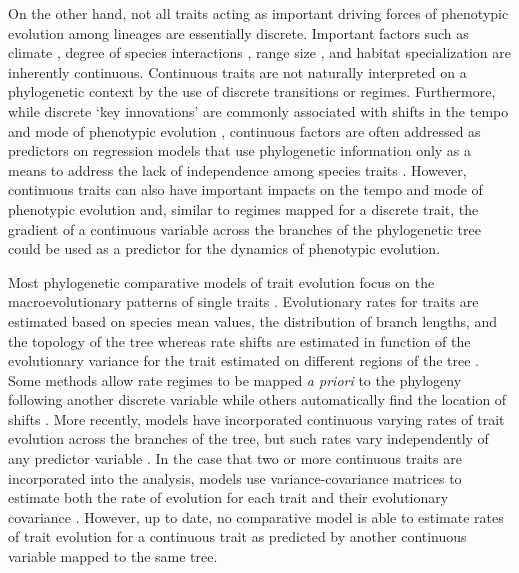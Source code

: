 On the other hand, not all traits acting as important driving forces of phenotypic evolution among lineages are essentially discrete. Important factors such as climate \citep{hunt_simple_2015, clavel_accelerated_2017}, degree of species interactions \citep{galetti_functional_2013, thompson_diversification_2013}, range size \citep{Diniz_range_1998, pigot_speciation_2012}, and habitat specialization \citep{bonetti_evolution_2014, hardy_specialization_2014} are inherently continuous. Continuous traits are not naturally interpreted on a phylogenetic context by the use of discrete transitions or regimes. Furthermore, while discrete `key innovations' are commonly associated with shifts in the tempo and mode of phenotypic evolution \citep[e.g.,][]{revell_phylogenetic_2009, claverie_modularity_2011, benson_rates_2013, dececchi_body_2013, maddison_unsolved_2015}, continuous factors are often addressed as predictors on regression models that use phylogenetic information only as a means to address the lack of independence among species traits \citep{felsenstein_1985, grafen_phylogenetic_1989, blomberg_independent_2012}. However, continuous traits can also have important impacts on the tempo and mode of phenotypic evolution and, similar to regimes mapped for a discrete trait, the gradient of a continuous variable across the branches of the phylogenetic tree could be used as a predictor for the dynamics of phenotypic evolution.

Most phylogenetic comparative models of trait evolution focus on the macroevolutionary patterns of single traits \citep{butler_phylogenetic_2004, omeara_testing_2006, Eastman_2011, rabosky_analysis_2014, Uyeda_BayOU}. Evolutionary rates for traits are estimated based on species mean values, the distribution of branch lengths, and the topology of the tree whereas rate shifts are estimated in function of the evolutionary variance for the trait estimated on different regions of the tree \citep{omeara_testing_2006, Eastman_2011}. Some methods allow rate regimes to be mapped \textit{a priori} to the phylogeny following another discrete variable \citep{butler_phylogenetic_2004, omeara_testing_2006} while others automatically find the location of shifts \citep{Eastman_2011, rabosky_analysis_2014, Uyeda_BayOU}. More recently, models have incorporated continuous varying rates of trait evolution across the branches of the tree, but such rates vary independently of any predictor variable \citep{rabosky_analysis_2014}. In the case that two or more continuous traits are incorporated into the analysis, models use variance-covariance matrices to estimate both the rate of evolution for each trait and their evolutionary covariance \citep{revell_phylogenetic_2009, bartoszek_phylogenetic_2012, Clavel_mvmorph, caetano_sysbio_2017}. However, up to date, no comparative model is able to estimate rates of trait evolution for a continuous trait as predicted by another continuous variable mapped to the same tree.

